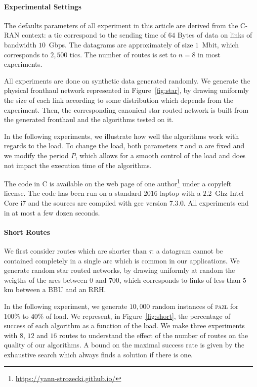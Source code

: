 \documentclass[a4paper,10pt]{article}
\newcommand\pazl{\textsc{pazl}\xspace}
\begin{document}
   \paragraph{Experimental Settings}

     The defaults parameters of all experiment in this article are derived from the C-RAN context: a tic correspond to the sending time of $64$ Bytes of data on links of bandwidth $10$~Gbps. The datagrams are approximately of size $1$~Mbit, which corresponds to $2,500$ tics. The number of routes is set to $n = 8$ in most experiments. 

     All experiments are done on synthetic data generated randomly. We generate the physical fronthaul
     network represented in Figure~\ref{fig:star}, by drawing uniformly the size of each link according 
     to some distribution which depends from the experiment. Then, the corresponding canonical star routed network is built from the generated fronthaul and the algorithms tested on it. 

     In the following experiments, we illustrate how well the algorithms work with regards to the load. To change the load, both parameters $\tau$ and $n$ are fixed and we modify the period $P$, which allows for a smooth control of the load and does not impact the execution time of the algorithms.


     The code in C is available on the web page of one author\footnote{\url{https://yann-strozecki.github.io/}} under a copyleft license. The code has been run on a standard $2016$ laptop with a $2.2$~Ghz Intel Core i7 and the sources are compiled with gcc version 7.3.0. All experiments end in at most a few dozen seconds.
      \paragraph{Short Routes}
      
    

 We first consider routes which are shorter than $\tau$: a datagram cannot be contained completely in a single arc which is common in our applications. We generate random star routed networks, by drawing uniformly at random the weigths of the arcs between $0$ and $700$, which corresponds to links of less than $5$km between a BBU and an RRH.

        In the following experiment, we generate $10,000$ random instances of \pazl for $100\%$ to $40\%$ of load. We represent, in Figure~\ref{fig:short}, the percentage of success of each algorithm as a function of the load. We make three experiments with $8$, $12$ and $16$ routes to understand the effect of the number of routes on the quality of our algorithms. A bound on the maximal success rate is given by the exhaustive search which always finds a solution if there is one. 
      
\end{document}
